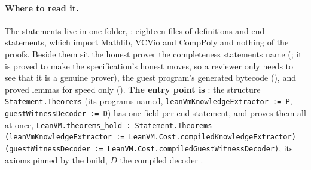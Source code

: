 \documentclass[11pt]{article}
\begin{document}
\paragraph{Where to read it.} The statements live in one folder, : eighteen files
of definitions and end statements, which import Mathlib,
VCVio and CompPoly and nothing of the proofs. Beside them sit the honest prover the completeness
statements name (; it is proved to make the specification's
honest moves, so a reviewer only needs to see that it is a genuine prover), the guest program's
generated bytecode (), and proved  lemmas for speed only
(). \textbf{The entry point is }: the
structure \texttt{Statement.Theorems} (its programs named, \texttt{leanVmKnowledgeExtractor := P},
\texttt{guestWitnessDecoder := D}) has one field per end statement, and
 proves them all at once,
\texttt{LeanVM.theorems\_hold : Statement.Theorems
(leanVmKnowledgeExtractor := LeanVM.Cost.compiledKnowledgeExtractor)
(guestWitnessDecoder := LeanVM.Cost.compiledGuestWitnessDecoder)}, its axioms pinned by the build,
$D$ the compiled decoder .
\end{document}
